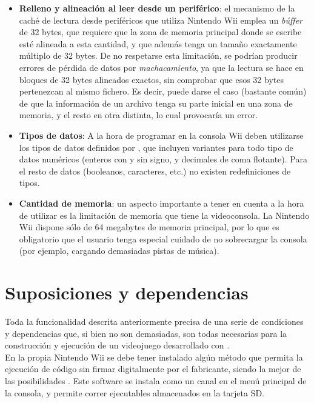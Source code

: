 \begin{itemize}
\item \textbf{Relleno y alineación al leer desde un periférico}: el mecanismo de la caché de lectura desde periféricos que utiliza Nintendo Wii emplea un \emph{búffer} de 32 bytes, que requiere que la zona de memoria principal donde se escribe esté alineada a esta cantidad, y que además tenga un tamaño exactamente múltiplo de 32 bytes. De no respetarse esta limitación, se podrían producir errores de pérdida de datos por \emph{machacamiento}, ya que la lectura se hace en bloques de 32 bytes alineados exactos, sin comprobar que esos 32 bytes pertenezcan al mismo fichero. Es decir, puede darse el caso (bastante común) de que la información de un archivo tenga su parte inicial en una zona de memoria, y el resto en otra distinta, lo cual provocaría un error.
\item \textbf{Tipos de datos}: A la hora de programar en la consola Wii deben utilizarse los tipos de datos definidos por , que incluyen variantes para todo tipo de datos numéricos (enteros con y sin signo, y decimales de coma flotante). Para el resto de datos (booleanos, caracteres, etc.) no existen redefiniciones de tipos.
\item \textbf{Cantidad de memoria}: un aspecto importante a tener en cuenta a la hora de utilizar  es la limitación de memoria que tiene la videoconsola. La Nintendo Wii dispone sólo de 64 megabytes de memoria principal, por lo que es obligatorio que el usuario tenga especial cuidado de no sobrecargar la consola (por ejemplo, cargando demasiadas pistas de música).
\end{itemize}

\section{Suposiciones y dependencias}

Toda la funcionalidad descrita anteriormente precisa de una serie de condiciones y dependencias que, si bien no son demasiadas, son todas necesarias para la construcción y ejecución de un videojuego desarrollado con .\\

En la propia Nintendo Wii se debe tener instalado algún método que permita la ejecución de código sin firmar digitalmente por el fabricante, siendo la mejor de las posibilidades  \cite{website:hbc}. Este software se instala como un canal en el menú principal de la consola, y permite correr ejecutables almacenados en la tarjeta SD.\\

